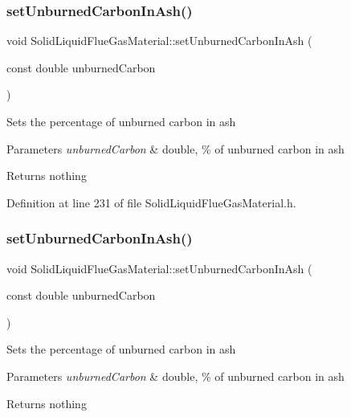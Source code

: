 \subsubsection{\texorpdfstring{set\+Unburned\+Carbon\+In\+Ash()}{setUnburnedCarbonInAsh()}\hspace{0.1cm}{\footnotesize\ttfamily [2/3]}}
{\footnotesize\ttfamily void Solid\+Liquid\+Flue\+Gas\+Material\+::set\+Unburned\+Carbon\+In\+Ash (\begin{DoxyParamCaption}\item[{const double}]{unburned\+Carbon }\end{DoxyParamCaption})\hspace{0.3cm}{\ttfamily [inline]}}

Sets the percentage of unburned carbon in ash 
\begin{DoxyParams}{Parameters}
{\em unburned\+Carbon} & double, \% of unburned carbon in ash \\
\hline
\end{DoxyParams}
\begin{DoxyReturn}{Returns}
nothing 
\end{DoxyReturn}


Definition at line 231 of file Solid\+Liquid\+Flue\+Gas\+Material.\+h.

\mbox{\label{class_solid_liquid_flue_gas_material_adf052dd1bdceeab710a4986b1fd874b9}} 
\subsubsection{\texorpdfstring{set\+Unburned\+Carbon\+In\+Ash()}{setUnburnedCarbonInAsh()}\hspace{0.1cm}{\footnotesize\ttfamily [3/3]}}
{\footnotesize\ttfamily void Solid\+Liquid\+Flue\+Gas\+Material\+::set\+Unburned\+Carbon\+In\+Ash (\begin{DoxyParamCaption}\item[{const double}]{unburned\+Carbon }\end{DoxyParamCaption})\hspace{0.3cm}{\ttfamily [inline]}}

Sets the percentage of unburned carbon in ash 
\begin{DoxyParams}{Parameters}
{\em unburned\+Carbon} & double, \% of unburned carbon in ash \\
\hline
\end{DoxyParams}
\begin{DoxyReturn}{Returns}
nothing 
\end{DoxyReturn}


